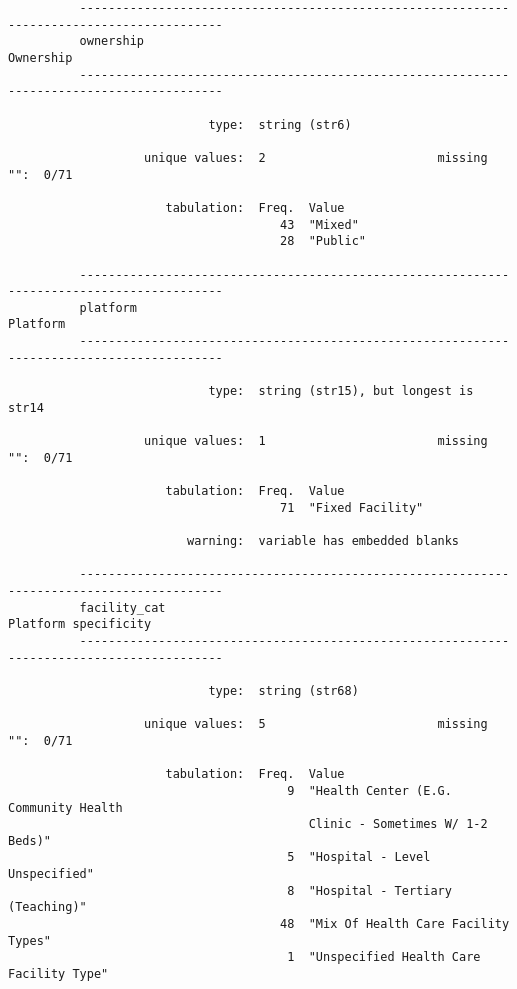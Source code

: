 \documentclass{article}
\begin{document}
\begin{verbatim}
          ------------------------------------------------------------------------------------------
          ownership                                                                        Ownership
          ------------------------------------------------------------------------------------------
          
                            type:  string (str6)
          
                   unique values:  2                        missing "":  0/71
          
                      tabulation:  Freq.  Value
                                      43  "Mixed"
                                      28  "Public"
          
          ------------------------------------------------------------------------------------------
          platform                                                                          Platform
          ------------------------------------------------------------------------------------------
          
                            type:  string (str15), but longest is str14
          
                   unique values:  1                        missing "":  0/71
          
                      tabulation:  Freq.  Value
                                      71  "Fixed Facility"
          
                         warning:  variable has embedded blanks
          
          ------------------------------------------------------------------------------------------
          facility_cat                                                          Platform specificity
          ------------------------------------------------------------------------------------------
          
                            type:  string (str68)
          
                   unique values:  5                        missing "":  0/71
          
                      tabulation:  Freq.  Value
                                       9  "Health Center (E.G. Community Health
                                          Clinic - Sometimes W/ 1-2 Beds)"
                                       5  "Hospital - Level Unspecified"
                                       8  "Hospital - Tertiary (Teaching)"
                                      48  "Mix Of Health Care Facility Types"
                                       1  "Unspecified Health Care Facility Type"
          

\end{verbatim}
\end{document}
